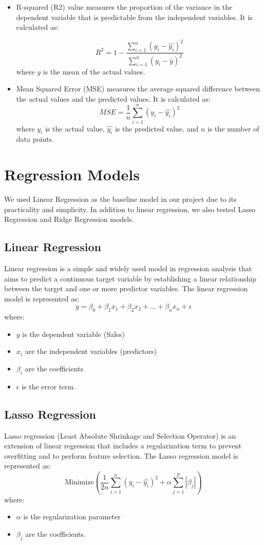 \documentclass[12pt]{report}
\begin{document}
\begin{itemize}
    \item R-squared (R2) value measures the proportion of the variance in the dependent variable that is predictable from the independent variables. It is calculated as:

\[
R^2 = 1 - \frac{\sum_{i=1}^{n}(y_i - \hat{y_i})^2}{\sum_{i=1}^{n}(y_i - \bar{y})^2}
\]
where \( y \) is the mean of the actual values.

   \item Mean Squared Error (MSE) measures the average squared difference between the actual values and the predicted values. It is calculated as:
\[
MSE = \frac{1}{n} \sum_{i=1}^{n} (y_i - \hat{y_i})^2
\]
where \( y_i \) is the actual value, \( \hat{y_i} \) is the predicted value, and \( n \) is the number of data points.
 
\end{itemize}

\section{Regression Models}
We used Linear Regression as the baseline model in our project due to its practicality and simplicity. In addition to linear regression, we also tested Lasso Regression and Ridge Regression models.

\subsection{Linear Regression}
Linear regression is a simple and widely used model in regression analysis that aims to predict a continuous target variable by establishing a linear relationship between the target and one or more predictor variables. The linear regression model is represented as:
\[
y = \beta_0 + \beta_1 x_1 + \beta_2 x_2 + \ldots + \beta_n x_n + \epsilon
\]
where:
\begin{itemize}
    \item \( y \) is the dependent variable (Sales)
    \item \( x_i \) are the independent variables (predictors)
    \item \( \beta_i \) are the coefficients
    \item \( \epsilon \) is the error term.
\end{itemize}

\subsection{Lasso Regression}
Lasso regression (Least Absolute Shrinkage and Selection Operator) is an extension of linear regression that includes a regularization term to prevent overfitting and to perform feature selection. The Lasso regression model is represented as:
\[
\text{Minimize} \left( \frac{1}{2n} \sum_{i=1}^{n} \left( y_i - \hat{y_i} \right)^2 + \alpha \sum_{j=1}^{p} \left| \beta_j \right| \right)
\]
where:
\begin{itemize}
    \item \( \alpha \) is the regularization parameter
    \item \( \beta_j \) are the coefficients.
\end{itemize}
\end{document}
